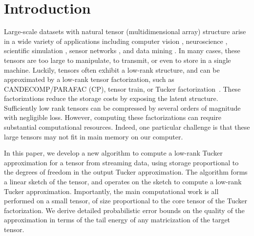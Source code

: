 \section{Introduction}

Large-scale datasets with natural tensor (multidimensional array) structure
arise in a wide variety of applications including
computer vision \citep{vasilescu2002multilinear},
neuroscience \citep{cichocki2013tensor},
scientific simulation \citep{austin2016parallel},
sensor networks \citep{sun2008incremental},
and data mining \citep{kolda2008scalable}.
In many cases, these tensors are too large to manipulate, to transmit,
or even to store in a single machine.
Luckily, tensors often exhibit a low-rank structure,
and can be approximated by a low-rank tensor factorization,
such as CANDECOMP/PARAFAC (CP), tensor train, or Tucker factorization~\citep{kolda2009tensor}.
These factorizations reduce the storage costs
by exposing the latent structure.
Sufficiently low rank tensors can be compressed by several orders of magnitude
with negligible loss.
However, computing these factorizations can require
substantial computational resources.
Indeed, one particular challenge is that these large tensors
may not fit in main memory on our computer.

In this paper, we develop a new algorithm to compute a low-rank Tucker
approximation for a tensor from streaming data,
using storage proportional to the degrees of freedom in the output Tucker approximation.
The algorithm forms a linear sketch of the tensor,
and operates on the sketch to compute a low-rank Tucker approximation.
Importantly, the main computational work is all performed on
a small tensor, of size proportional to the core tensor of the Tucker factorization.
We derive detailed probabilistic error bounds on the quality of the approximation
in terms of the tail energy of any matricization of the target tensor.

